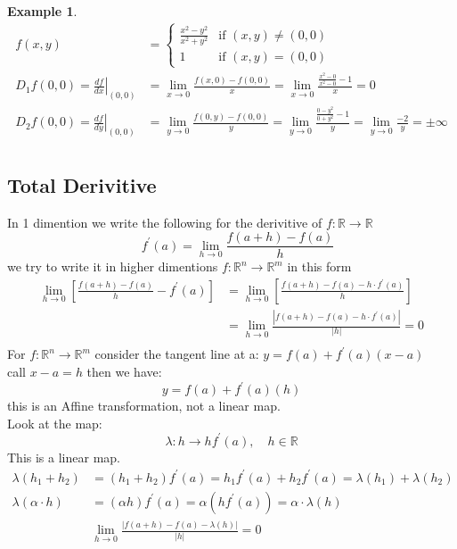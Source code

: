 \documentclass[11pt]{article}
\def\RR{\mathbb{R}}
\newtheorem{example}{Example}[section]
\begin{document}
\begin{example}
\begin{align*}
 f(x,y) &=
  \begin{cases}
   \frac{x^{2} - y^{2}}{x^{2} + y^{2}} & \text{if } (x,y) \neq (0,0) \\
   1       & \text{if } (x,y) = (0,0)
  \end{cases}\\
 D_{1}f(0,0) =\left.\frac{df}{dx}\right| _{(0,0)} &=  \lim_{x \to 0}\frac{f(x,0) - f(0,0)}{x}= \lim_{x \to 0}\frac{\frac{x^{2}-0}{x^{2}-0} -1}{x} = 0\\
D_{2}f(0,0) =\left.\frac{df}{dy}\right| _{(0,0)} &=  \lim_{y \to 0}\frac{f(0,y) - f(0,0)}{y}= \lim_{y \to 0}\frac{\frac{0-y^{2}}{0+y^{2}} -1}{y} = \lim_{y \to 0} \frac{-2}{y}= \pm \infty\\
\end{align*}
\end{example}

\subsection{Total Derivitive}


In 1 dimention we write the following for the derivitive of $f:\RR \rightarrow \RR$
\[\quad f^{'}(a)=\lim_{h \to 0}\frac{f(a+h) - f(a)}{h}\]
we try to write it in higher dimentions $f:\RR^{n} \rightarrow \RR^{m}$ in this form
\begin{align*}
\lim_{h \to 0}\left[\frac{f(a+h) - f(a)}{h} - f^{'}(a)\right] &=\lim_{h \to 0}\left[\frac{f(a+h) - f(a) - h \cdot f^{'}(a)}{h}\right]\\
&=\lim_{h \to 0}\frac{|f(a+h) - f(a) - h \cdot f^{'}(a)|}{|h|} =0 \\
\end{align*}
For $f:\RR^{n} \rightarrow \RR^{m}$ consider the tangent line at a: $y=f(a) +f^{'}(a)(x-a)$\\
call $x-a = h$ then we have: \[y=f(a) +f^{'}(a)(h)\]
this is an Affine transformation, not a linear map.\\
Look at the map:
\[\lambda:h \rightarrow hf^{'}(a), \quad h \in \RR\]
This is a linear map.
\begin{align*}
\lambda(h_{1} + h_{2})&=(h_{1} + h_{2})f^{'}(a)= h_{1}f^{'}(a) + h_{2}f^{'}(a) =\lambda(h_{1}) + \lambda(h_{2})\\
\lambda(\alpha \cdot h)&=(\alpha h)f^{'}(a)=\alpha(hf^{'}(a))=\alpha \cdot\lambda( h)\\
&\lim_{h \to 0}\frac{|f(a+h) - f(a) - \lambda(h)|}{|h|} =0 \\
\end{align*}
\end{document}
